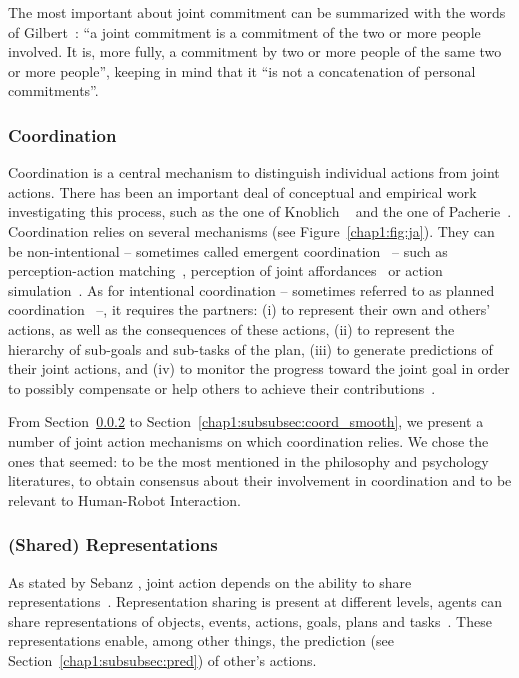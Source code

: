 \documentclass[a4paper,11pt,twoside]{StyleThese}
\begin{document}
The most important about joint commitment can be summarized with the words of Gilbert~\cite[p.~7]{gilbert_2013_joint}: ``a joint commitment is a commitment of the two or more people involved. It is, more fully, a commitment by two or more people of the same two or more people'', keeping in mind that it ``is not a concatenation of personal commitments''. 

\subsubsection{Coordination}
Coordination is a central mechanism to distinguish individual actions from joint actions. There has been an important deal of conceptual and empirical work investigating this process, such as the one of Knoblich \etal~\cite{knoblich_2011_joint} and the one of Pacherie~\cite{pacherie_2012_agency}. Coordination relies on several mechanisms (see Figure~\ref{chap1:fig:ja}). They can be non-intentional -- sometimes called emergent coordination~\cite{knoblich_2011_joint} -- such as perception-action matching~\cite{brass_2001_movement}, perception of joint affordances~\cite{ramenzoni_2008_short} or action simulation~\cite{sebanz_2009_prediction}. As for intentional coordination – sometimes referred to as planned coordination~\cite{knoblich_2011_joint} –, it requires the partners: (i) to represent their own and others' actions, as well as the consequences of these actions, (ii) to represent the hierarchy of sub-goals and sub-tasks of the plan, (iii) to generate predictions of their joint actions, and (iv) to monitor the progress toward the joint goal in order to possibly compensate or help others to achieve their contributions~\cite{pacherie_2012_agency}. 

From Section~\ref{chap1:subsubsec:shared_rep} to Section~\ref{chap1:subsubsec:coord_smooth}, we present a number of joint action mechanisms on which coordination relies. We chose the ones that seemed: to be the most mentioned in the philosophy and psychology literatures, to obtain consensus about their involvement in coordination and to be relevant to Human-Robot Interaction. 

\subsubsection{(Shared) Representations}\label{chap1:subsubsec:shared_rep}
As stated by Sebanz \etal, joint action depends on the ability to share representations~\cite{sebanz_2006_joint}. Representation sharing is present at different levels, \ie agents can share representations of objects, events, actions, goals, plans and tasks~\cite{pacherie_2012_agency,vesper_2017_joint}. These representations enable, among other things, the prediction (see Section~\ref{chap1:subsubsec:pred}) of other's actions. 
\end{document}
